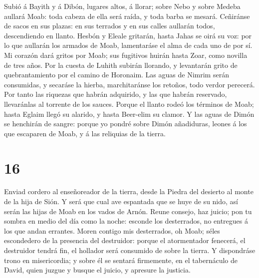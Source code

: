  Subió á Bayith y á Dibón, lugares altos, á llorar; sobre
Nebo y sobre Medeba aullará Moab: toda cabeza de ella será raída, y toda
barba se mesará.  Ceñiránse de sacos en sus plazas: en sus
terrados y en sus calles aullarán todos, descendiendo en llanto.
 Hesbón y Eleale gritarán, hasta Jahas se oirá su voz: por
lo que aullarán los armados de Moab, lamentaráse el alma de cada uno de
por sí.  Mi corazón dará gritos por Moab; sus fugitivos
huirán hasta Zoar, como novilla de tres años. Por la cuesta de Luhith
subirán llorando, y levantarán grito de quebrantamiento por el camino de
Horonaim.  Las aguas de Nimrim serán consumidas, y secaráse
la hierba, marchitaránse los retoños, todo verdor perecerá. 
Por tanto las riquezas que habrán adquirido, y las que habrán reservado,
llevaránlas al torrente de los sauces.  Porque el llanto
rodeó los términos de Moab; hasta Eglaim llegó su alarido, y hasta
Beer-elim su clamor.  Y las aguas de Dimón se henchirán de
sangre: porque yo pondré sobre Dimón añadiduras, leones á los que
escaparen de Moab, y á las reliquias de la tierra.

\hypertarget{section-15}{%
\section{16}\label{section-15}}

 Enviad cordero al enseñoreador de la tierra, desde la
Piedra del desierto al monte de la hija de Sión.  Y será que
cual ave espantada que se huye de su nido, así serán las hijas de Moab
en los vados de Arnón.  Reune consejo, haz juicio; pon tu
sombra en medio del día como la noche: esconde los desterrados, no
entregues á los que andan errantes.  Moren contigo mis
desterrados, oh Moab; séles escondedero de la presencia del destruidor:
porque el atormentador fenecerá, el destruidor tendrá fin, el hollador
será consumido de sobre la tierra.  Y dispondráse trono en
misericordia; y sobre él se sentará firmemente, en el tabernáculo de
David, quien juzgue y busque el juicio, y apresure la justicia.

